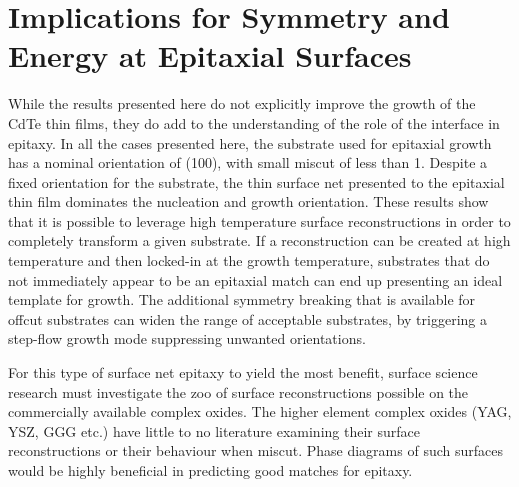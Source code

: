 \section{Implications for Symmetry and Energy at Epitaxial Surfaces}
While the results presented here do not explicitly improve the growth of the CdTe thin films, they do add to the understanding of the role of the interface in epitaxy.
In all the cases presented here, the substrate used for epitaxial growth has a nominal orientation of (100), with small miscut of less than 1\degree{}.
Despite a fixed orientation for the substrate, the thin surface net presented to the epitaxial thin film dominates the nucleation and growth orientation.
These results show that it is possible to leverage high temperature surface reconstructions in order to completely transform a given substrate.
If a reconstruction can be created at high temperature and then locked-in at the growth temperature, substrates that do not immediately appear to be an epitaxial match can end up presenting an ideal template for growth.
The additional symmetry breaking that is available for offcut substrates can widen the range of acceptable substrates, by triggering a step-flow growth mode suppressing unwanted orientations.

For this type of surface net epitaxy to yield the most benefit, surface science research must investigate the zoo of surface reconstructions possible on the commercially available complex oxides.
The higher element complex oxides (YAG, YSZ, GGG etc.) have little to no literature examining their surface reconstructions or their behaviour when miscut.
Phase diagrams of such surfaces would be highly beneficial in predicting good matches for epitaxy.
